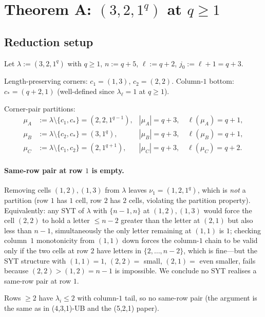 \documentclass[11pt]{article}
\theoremstyle{definition}
\begin{document}
\section{Theorem A: $(3, 2, 1^q)$ at $q \ge 1$}\label{sec:321}

\subsection{Reduction setup}

Let $\lambda := (3, 2, 1^q)$ with $q \ge 1$, $n := q + 5$,
$\ell := q + 2$, $j_0 := \ell + 1 = q + 3$.

Length-preserving corners: $c_1 = (1, 3)$, $c_2 = (2, 2)$. Column-$1$
bottom: $c_* = (q + 2, 1)$ (well-defined since $\lambda_\ell = 1$
at $q \ge 1$).

Corner-pair partitions:
\begin{align*}
   \mu_A &:= \lambda \setminus \{c_1, c_*\} = (2, 2, 1^{q-1}),
      & |\mu_A| = q + 3, \quad \ell(\mu_A) = q + 1,\\
   \mu_B &:= \lambda \setminus \{c_2, c_*\} = (3, 1^q),
      & |\mu_B| = q + 3, \quad \ell(\mu_B) = q + 1,\\
   \mu_C &:= \lambda \setminus \{c_1, c_2\} = (2, 1^{q+1}),
      & |\mu_C| = q + 3, \quad \ell(\mu_C) = q + 2.
\end{align*}

\paragraph{Same-row pair at row $1$ is empty.}
Removing cells $(1, 2), (1, 3)$ from $\lambda$ leaves $\nu_1 =
(1, 2, 1^q)$, which is \emph{not} a partition (row $1$ has $1$ cell,
row $2$ has $2$ cells, violating the partition property). Equivalently:
any SYT of $\lambda$ with $\{n-1, n\}$ at $(1, 2), (1, 3)$ would force
the cell $(2, 2)$ to hold a letter $\le n - 2$ greater than the letter
at $(2, 1)$ but also less than $n - 1$, simultaneously the only letter
remaining at $(1, 1)$ is $1$; checking column~$1$ monotonicity from
$(1, 1)$ down forces the column-$1$ chain to be valid only if the
two cells at row $2$ have letters in $\{2, \ldots, n - 2\}$, which is
fine---but the SYT structure with $(1, 1) = 1$, $(2, 2) =$ small,
$(2, 1) =$ even smaller, fails because $(2, 2) > (1, 2) = n - 1$
is impossible. We conclude no SYT realises a same-row pair at row $1$.

Rows $\ge 2$ have $\lambda_i \le 2$ with column-$1$ tail, so no
same-row pair (the argument is the same as in
(4,3,1)-UB and the (5,2,1) paper).
\end{document}
